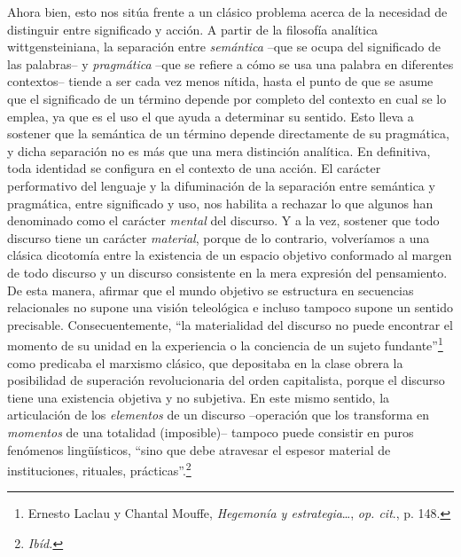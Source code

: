 Ahora bien, esto nos sitúa frente a un clásico problema acerca de la
necesidad de distinguir entre significado y acción. A partir de la
filosofía analítica wittgensteiniana, la separación entre
\emph{semántica} --que se ocupa del significado de las palabras-- y
\emph{pragmática} --que se refiere a cómo se usa una palabra en
diferentes contextos-- tiende a ser cada vez menos nítida, hasta el
punto de que se asume que el significado de un término depende por
completo del contexto en cual se lo emplea, ya que es el uso el que
ayuda a determinar su sentido. Esto lleva a sostener que la semántica de
un término depende directamente de su pragmática, y dicha separación no
es más que una mera distinción analítica. En definitiva, toda identidad
se configura en el contexto de una acción. El carácter performativo del
lenguaje y la difuminación de la separación entre semántica y
pragmática, entre significado y uso, nos habilita a rechazar lo que
algunos han denominado como el carácter \emph{mental} del discurso. Y a
la vez, sostener que todo discurso tiene un carácter \emph{material},
porque de lo contrario, volveríamos a una clásica dicotomía entre la
existencia de un espacio objetivo conformado al margen de todo discurso
y un discurso consistente en la mera expresión del pensamiento. De esta
manera, afirmar que el mundo objetivo se estructura en secuencias
relacionales no supone una visión teleológica e incluso tampoco supone
un sentido precisable. Consecuentemente, \enquote{la materialidad del discurso
no puede encontrar el momento de su unidad en la experiencia o la
conciencia de un sujeto fundante}\footnote{Ernesto Laclau y Chantal
  Mouffe, \emph{Hegemonía y estrategia}\ldots, \emph{op. cit}., p. 148.}
como predicaba el marxismo clásico, que depositaba en la clase obrera la
posibilidad de superación revolucionaria del orden capitalista, porque
el discurso tiene una existencia objetiva y no subjetiva. En este mismo
sentido, la articulación de los \emph{elementos} de un discurso
--operación que los transforma en \emph{momentos} de una totalidad
(imposible)-- tampoco puede consistir en puros fenómenos lingüísticos,
\enquote{sino que debe atravesar el espesor material de instituciones, rituales,
prácticas}.\footnote{\emph{Ibíd.}}

